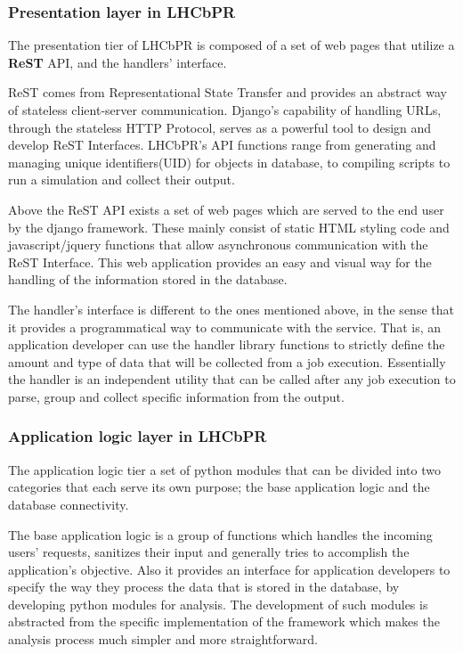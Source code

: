 \documentclass{lhcbnote}
\begin{document}
\subsubsection{Presentation layer in LHCbPR}

The presentation tier of LHCbPR is composed of a set of web pages that utilize a {\bf ReST} API, and the handlers' interface.

ReST comes from Representational State Transfer and provides an abstract way of stateless client-server communication. Django's capability of handling URLs, 
through the stateless HTTP Protocol, serves as a powerful tool to design and develop ReST Interfaces. LHCbPR's API functions range from generating and managing
unique identifiers(UID) for objects in database, to compiling scripts to run a simulation and collect their output.

Above the ReST API exists a set of web pages which are served to the end user by the django framework. These mainly consist of static HTML 
styling code and javascript/jquery functions that allow asynchronous communication with the ReST Interface. This web application provides an easy and 
visual way for the handling of the information stored in the database. 

The handler's interface is different to the ones mentioned above, in the sense that it provides a programmatical way to communicate with the service. 
That is, an application developer can use the handler library functions to strictly define the amount and type of data that will be collected from a job execution. 
Essentially the handler is an independent utility that can be called after any job execution to parse, group and collect specific information from the output.

\subsubsection{Application logic layer in LHCbPR}

The application logic tier a set of python modules that can be divided into two categories that each serve its own purpose; the base application logic and the 
database connectivity.

The base application logic is a group of functions which handles the incoming users' requests, sanitizes their input and generally tries to accomplish the application's 
objective. Also it provides an interface for application developers to specify the way they process the data that is stored in the database, by developing python 
modules for analysis. The development of such modules is abstracted from the specific implementation of the framework which makes the analysis process much 
simpler and more straightforward. 
\end{document}

